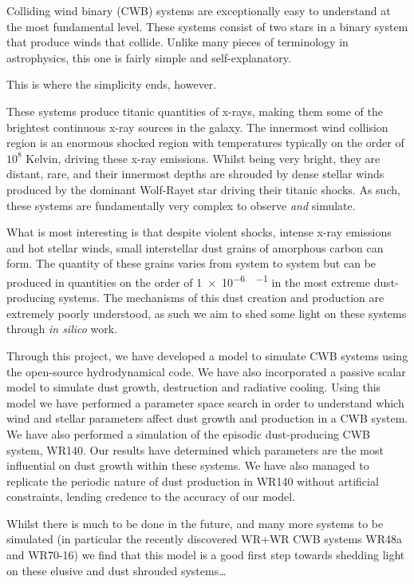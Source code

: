 


\begin{abstracts}        %

\setlength{\parindent}{17.62482pt}
\setlength{\parskip}{0.0pt plus 1.0pt}

Colliding wind binary (CWB) systems are exceptionally easy to understand at the most fundamental level.
These systems consist of two stars in a binary system that produce winds that collide.
Unlike many pieces of terminology in astrophysics, this one is fairly simple and self-explanatory.

\begin{center}
  This is where the simplicity ends, however.
\end{center}

These systems produce titanic quantities of x-rays, making them some of the brightest continuous x-ray sources in the galaxy.
The innermost wind collision region is an enormous shocked region with temperatures typically on the order of $10^8$ Kelvin, driving these x-ray emissions.
Whilst being very bright, they are distant, rare, and their innermost depths are shrouded by dense stellar winds produced by the dominant Wolf-Rayet star driving their titanic shocks.
As such, these systems are fundamentally very complex to observe \emph{and} simulate.

What is most interesting is that despite violent shocks, intense x-ray emissions and hot stellar winds, small interstellar dust grains of amorphous carbon can form.
The quantity of these grains varies from system to system but can be produced in quantities on the order of \SI{1e-6}{\solarmass\per\year} in the most extreme dust-producing systems.
The mechanisms of this dust creation and production are extremely poorly understood, as such we aim to shed some light on these systems through \emph{in silico} work.

Through this project, we have developed a model to simulate CWB systems using the open-source \athena{} hydrodynamical code.
We have also incorporated a passive scalar model to simulate dust growth, destruction and radiative cooling.
Using this model we have performed a parameter space search in order to understand which wind and stellar parameters affect dust growth and production in a CWB system.
We have also performed a simulation of the episodic dust-producing CWB system, WR140.
Our results have determined which parameters are the most influential on dust growth within these systems.
We have also managed to replicate the periodic nature of dust production in WR140 without artificial constraints, lending credence to the accuracy of our model.

Whilst there is much to be done in the future, and many more systems to be simulated (in particular the recently discovered WR+WR CWB systems WR48a and WR70-16) we find that this model is a good first step towards shedding light on these elusive and dust shrouded systems\ldots
	
\end{abstracts}


